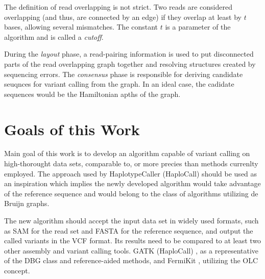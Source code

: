 The definition of read overlapping is not strict. Two reads are considered overlapping (and thus, are connected by an edge) if they overlap at least by $t$ bases, allowing several mismatches. The constant $t$ is a parameter of the algorithm and is called a \textit{cutoff}.

During the \textit{layout} phase, a read-pairing information is used to put disconnected parts of the read overlapping graph together and resolving structures created by sequencing errors. The \textit{consensus} phase is responsible for deriving candidate seuqnces for variant calling from the graph. In an ideal case, the cadidate sequences would be the Hamiltonian apths of the graph.

\section{Goals of this Work}
\label{sec:goals-of-this-work}

Main goal of this work is to develop an algorithm capable of variant calling on high-thorought data sets, comparable to, or more precies than methods currenlty employed. The approach used by HaplotypeCaller (HaploCall) should be used as an inspiration which implies the newly developed algorithm would take advantage of the reference sequence and would belong to the class of algorithms utilizing de Bruijn graphs.

The new algorithm should accept the input data set in widely used formats, such as SAM for the read set and FASTA for the reference sequence, and output the called variants in the VCF format. Its results need to be compared to at least two other assembly and variant calling tools. GATK (HaploCall) \cite{haplocall}, as a representative of the DBG class and reference-aided methods, and FermiKit \cite{fermikit}, utilizing the OLC concept.